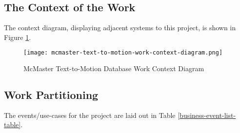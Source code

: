 \documentclass{scrreprt}
\begin{document}
\subsection{The Context of the Work}

The context diagram, displaying adjacent systems to this project, is shown in
Figure \ref{work-context-diagram}.

\begin{figure}
        \caption{McMaster Text-to-Motion Database Work Context Diagram}
        \label{work-context-diagram}
        \centering
        \texttt{[image: mcmaster-text-to-motion-work-context-diagram.png]}
\end{figure}

\subsection{Work Partitioning}

The events/use-cases for the project are laid out in Table \ref{business-event-list-table}.
\end{document}

